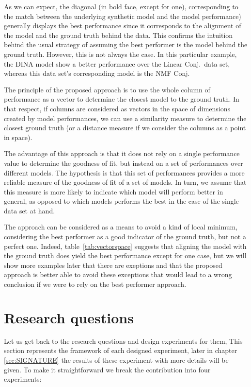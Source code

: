 As we can expect, the diagonal (in bold face, except for one), corresponding to the match between the underlying synthetic model and the model performance) generally displays the best performance since it corresponds to the alignment of the model and the ground truth behind the data.  This confirms the intuition behind the usual strategy of assuming the best performer is the model behind the ground truth.  However, this is not always the case. In this particular example, the DINA model show a better performance over the Linear Conj.\ data set, whereas this data set's corresponding model is the NMF Conj. 



The principle of the proposed approach is to use the whole column of performance as a vector to determine the closest model to the ground truth.  In that respect, if columns are considered as vectors in the space of dimensions created by model performances, we can use a similarity measure to determine the closest ground truth (or a distance measure if we consider the columns as a point in space).

The advantage of this approach is that it does not rely on a single performance value to determine the goodness of fit, but instead on a set of performances over different models.  The hypothesis is that this set of performances provides a more reliable measure of the goodness of fit of a set of models.  In turn, we assume that this measure is more likely to indicate which model will perform better in general, as opposed to which models performs the best in the case of the single data set at hand.

The approach can be considered as a means to avoid a kind of local minimum, considering the best performer as a good indicator of the ground truth, but not a perfect one. Indeed, table~\ref{tab:vectorspace} suggests that aligning the model with the ground truth does yield the best performance except for one case, but we will show more examples later that there are exeptions and that the proposed approach is better able to avoid these exceptions that would lead to a wrong conclusion if we were to rely on the best performer approach.


\section{Research questions}

Let us get back to the research questions and design experiments for them, This section represents the framework of each designed experiment, later in chapter \ref{sec:SIGNATURE} the results of these experiment with more details will be given. To make it straightforward we break the contribution into four experiments:


